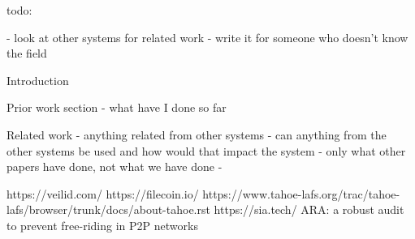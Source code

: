todo:

- look at other systems for related work
- write it for someone who doesn't know the field

Introduction


Prior work section
- what have I done so far

Related work
- anything related from other systems
- can anything from the other systems be used and how would that impact the system
- only what other papers have done, not what we have done
- 

https://veilid.com/
https://filecoin.io/
https://www.tahoe-lafs.org/trac/tahoe-lafs/browser/trunk/docs/about-tahoe.rst
https://sia.tech/
ARA: a robust audit to prevent free-riding in P2P networks
